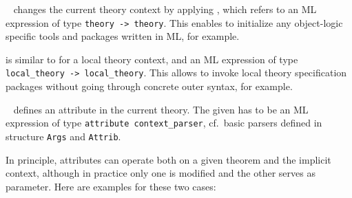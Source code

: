 \begin{isabellebody}
\begin{isamarkuptext}
\begin{description}
  \item \hyperlink{command.setup}{\mbox{}}~ changes the current theory
  context by applying , which refers to an ML expression
  of type \verb|theory -> theory|.  This enables to initialize
  any object-logic specific tools and packages written in ML, for
  example.

  \item \hyperlink{command.local-setup}{\mbox{}} is similar to \hyperlink{command.setup}{\mbox{}} for
  a local theory context, and an ML expression of type \verb|local_theory -> local_theory|.  This allows to
  invoke local theory specification packages without going through
  concrete outer syntax, for example.

  \item \hyperlink{command.attribute-setup}{\mbox{}}~
  defines an attribute in the current theory.  The given  has to be an ML expression of type
  \verb|attribute context_parser|, cf.\ basic parsers defined in
  structure \verb|Args| and \verb|Attrib|.

  In principle, attributes can operate both on a given theorem and the
  implicit context, although in practice only one is modified and the
  other serves as parameter.  Here are examples for these two cases:


\end{description}
\end{isamarkuptext}
\end{isabellebody}
